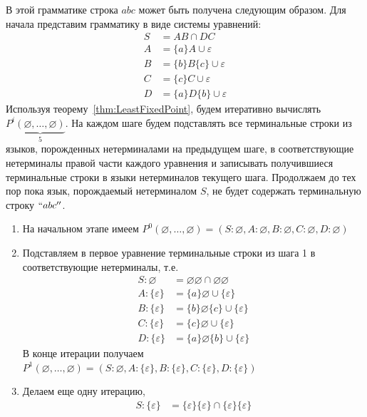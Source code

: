 \begin{example}
    В этой грамматике строка $abc$ может быть получена следующим образом. Для начала представим грамматику в виде системы уравнений:
    \begin{align*}
    S &= A B \cap D C \\
    A &= \{a\}A \cup \varepsilon \\
    B &= \{b\}B\{c\} \cup \varepsilon \\
    C &= \{c\}C \cup \varepsilon \\
    D &= \{a\}D\{b\} \cup \varepsilon
    \end{align*}
    Используя теорему~\ref{thm:LeastFixedPoint}, будем итеративно вычислять $P^{i}\underbrace{(\varnothing,\ldots,\varnothing)}_5$. На каждом шаге будем подставлять все терминальные строки из языков, порожденных нетерминалами на предыдущем шаге, в соответствующие нетерминалы правой части каждого уравнения и записывать получившиеся терминальные строки в языки нетерминалов текущего шага. Продолжаем до тех пор пока язык, порождаемый нетерминалом $S$, не будет содержать терминальную строку $``abc''$.
    \begin{enumerate}
        \item На начальном этапе имеем $P^{0}(\varnothing,\ldots,\varnothing) = (S: \varnothing, A: \varnothing, B: \varnothing, C: \varnothing, D: \varnothing)$
        \item Подставляем в первое уравнение терминальные строки из шага 1 в соответствующие нетерминалы, т.е.
        \begin{align*}
            S:  \varnothing &= \varnothing\varnothing \cap \varnothing\varnothing \\
            A: \{\varepsilon\} &= \{a\}\varnothing \cup \{\varepsilon\} \\
            B: \{\varepsilon\} &= \{b\}\varnothing\{c\} \cup \{\varepsilon\} \\
            C: \{\varepsilon\} &= \{c\}\varnothing \cup \{\varepsilon\} \\
            D: \{\varepsilon\} &= \{a\}\varnothing\{b\} \cup \{\varepsilon\}
        \end{align*}
        В конце итерации получаем $P^{1}(\varnothing,\ldots,\varnothing) = (S: \varnothing, A: \{\varepsilon\}, B: \{\varepsilon\}, C: \{\varepsilon\}, D: \{\varepsilon\})$
        \item Делаем еще одну итерацию,
        \begin{align*}
            S:  \{\varepsilon\} &= \{\varepsilon\}\{\varepsilon\} \cap \{\varepsilon\}\{\varepsilon\} \\

\end{align*}
\end{enumerate}
\end{example}
